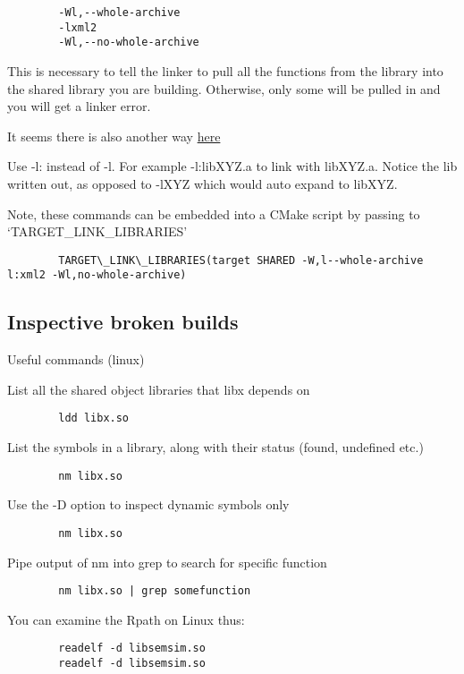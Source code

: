 \documentclass[../LabBook]{subfiles}
\begin{document}
    \begin{verbatim}
        -Wl,--whole-archive
        -lxml2
        -Wl,--no-whole-archive
    \end{verbatim}

    This is necessary to tell the linker to pull all the functions from the library into the shared library you are
    building. Otherwise, only some will be pulled in and you will get a linker error.

    It seems there is also another way \href{https://stackoverflow.com/questions/6578484/telling-gcc-directly-to-link-a-library-statically}{here}

    Use -l: instead of -l. For example -l:libXYZ.a to link with libXYZ.a. Notice the lib written out, as opposed to
    -lXYZ which would auto expand to libXYZ.

    Note, these commands can be embedded into a CMake script by passing to `TARGET\_LINK\_LIBRARIES'

    \begin{verbatim}
        TARGET\_LINK\_LIBRARIES(target SHARED -W,l--whole-archive l:xml2 -Wl,no-whole-archive)
    \end{verbatim}

    \subsection{Inspective broken builds}
    Useful commands (linux)

    List all the shared object libraries that libx depends on
    \begin{verbatim}
        ldd libx.so
    \end{verbatim}

    List the symbols in a library, along with their status (found, undefined etc.)
    \begin{verbatim}
        nm libx.so
    \end{verbatim}

    Use the -D option to inspect dynamic symbols only
    \begin{verbatim}
        nm libx.so
    \end{verbatim}

    Pipe output of nm into grep to search for specific function
    \begin{verbatim}
        nm libx.so | grep somefunction
    \end{verbatim}

    You can examine the Rpath on Linux thus:
    \begin{verbatim}
        readelf -d libsemsim.so
        readelf -d libsemsim.so
    \end{verbatim}
\end{document}
